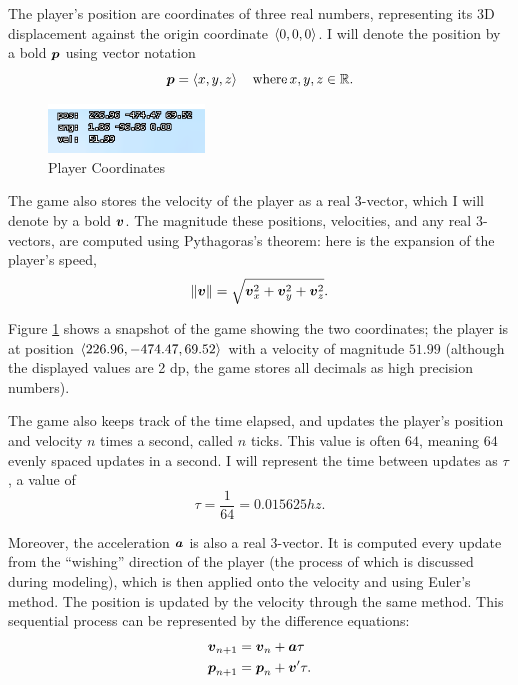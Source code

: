 The player's position are coordinates of three real numbers, representing its 3D displacement against the origin coordinate $\left\langle 0,0,0 \right\rangle$. I will denote the position by a bold $\boldsymbol{p}$ using vector notation
\[
    \boldsymbol{p} = \left\langle x, y, z \right\rangle \quad \text{where} \, x, y, z \in  \mathbb{R}.
\]

\begin{figure}
    \includegraphics[width=0.37\textwidth,right]{assets/1coords.png}
    \caption{Player Coordinates}
    \label{fig:1coords}
\end{figure}

The game also stores the velocity of the player as a real 3-vector, which I will denote by a bold $\boldsymbol{v}$. The magnitude these positions, velocities, and any real 3-vectors, are computed using Pythagoras's theorem: here is the expansion of the player's speed,
\[
    \|\boldsymbol{v}\| = \sqrt{\boldsymbol{v}_x^2+\boldsymbol{v}_y^2+\boldsymbol{v}_z^2}.
\]


Figure \ref{fig:1coords} shows a snapshot of the game showing the two coordinates; the player is at position $\left\langle 226.96, -474.47, 69.52 \right\rangle$ with a velocity of magnitude $51.99$ (although the displayed values are 2 dp, the game stores all decimals as high precision numbers).


The game also keeps track of the time elapsed, and updates the player's position and velocity $n$ times a second, called $n$ ticks. This value is often $64$, meaning $64$ evenly spaced updates in a second. I will represent the time between updates as $\tau$, a value of
\[
    \tau = \frac{1}{64} = 0.015625 \si{hz}.
\]

Moreover, the acceleration $\boldsymbol{a}$ is also a real 3-vector. It is computed every update from the ``wishing'' direction of the player (the process of which is discussed during modeling), which is then applied onto the velocity and using Euler's method. The position is updated by the velocity through the same method. This sequential process can be represented by the difference equations:
\begin{align}
    \boldsymbol{v}_{n+1} &= \boldsymbol{v}_n + \boldsymbol{a} \tau\\
    \boldsymbol{p}_{n+1} &= \boldsymbol{p}_n + \boldsymbol{v}' \tau.
\end{align}

